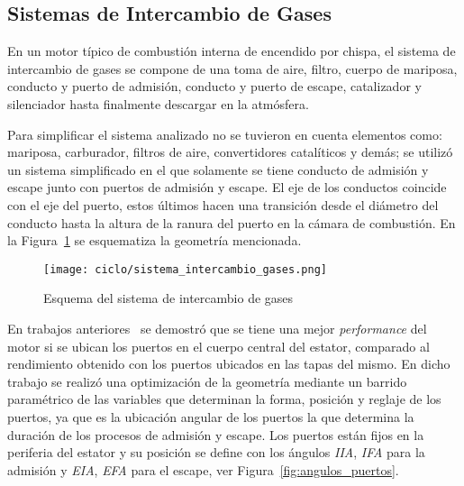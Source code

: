


\subsection{Sistemas de Intercambio de Gases}
%
En un motor típico de combustión interna de encendido por chispa, el sistema de
intercambio de gases se compone de una toma de aire, filtro, cuerpo de
mariposa, conducto y puerto de admisión, conducto y puerto de escape,
catalizador y silenciador hasta finalmente descargar en la atmósfera.

Para simplificar el sistema analizado no se tuvieron en cuenta elementos como:
mariposa, carburador, filtros de aire, convertidores catalíticos y demás; se
utilizó un sistema simplificado en el que solamente se tiene conducto de
admisión y escape junto con puertos de admisión y escape.
%
El eje de los conductos coincide con el eje del puerto, estos últimos hacen una
transición desde el diámetro del conducto hasta la altura de la ranura del
puerto en la cámara de combustión.
%
En la Figura~\ref{fig:sistema_intercambio_gases} se esquematiza la geometría
mencionada.

\begin{figure}
    \centering
    \texttt{[image: ciclo/sistema\_intercambio\_gases.png]}
    \caption{Esquema del sistema de intercambio de gases}\label{fig:sistema_intercambio_gases}
\end{figure}


En trabajos anteriores~\parencite{lopez13} se demostró que se tiene una mejor
\emph{performance} del motor si se ubican los puertos en el cuerpo central del
estator, comparado al rendimiento obtenido con los puertos ubicados en las
tapas del mismo.
%
En dicho trabajo se realizó una optimización de la geometría mediante un
barrido paramétrico de las variables que determinan la forma, posición y
reglaje de los puertos, ya que es la ubicación angular de los puertos la que
determina la duración de los procesos de admisión y escape.
%
Los puertos están fijos en la periferia del estator y su posición se define con
los ángulos \emph{IIA}, \emph{IFA} para la admisión y \emph{EIA}, \emph{EFA}
para el escape, ver Figura~\ref{fig:angulos_puertos}.

